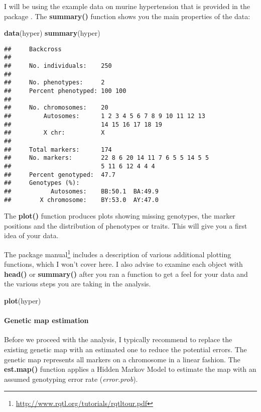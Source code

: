 \documentclass[12pt,]{krantz}
\newenvironment{Shaded}{\begin{snugshade}}{\end{snugshade}}
\newcommand{\KeywordTok}[1]{\textcolor[rgb]{0.27,0.27,0.27}{\textbf{{#1}}}}
\newcommand{\NormalTok}[1]{{#1}}
\let\oldparagraph\paragraph
\renewcommand{\paragraph}[1]{\oldparagraph{#1}\mbox{}}
\renewcommand{\href}[2]{#2\footnote{\url{#1}}}
\begin{document}
I will be using the example data on murine hypertension that is provided
in the package \citep{Sugiyama200170}. The \textbf{summary()} function
shows you the main properties of the data:

\begin{Shaded}
\begin{Highlighting}[]
\KeywordTok{data}\NormalTok{(hyper)}
\KeywordTok{summary}\NormalTok{(hyper)}
\end{Highlighting}
\end{Shaded}

\begin{verbatim}
##     Backcross
## 
##     No. individuals:    250 
## 
##     No. phenotypes:     2 
##     Percent phenotyped: 100 100 
## 
##     No. chromosomes:    20 
##         Autosomes:      1 2 3 4 5 6 7 8 9 10 11 12 13 
##                         14 15 16 17 18 19 
##         X chr:          X 
## 
##     Total markers:      174 
##     No. markers:        22 8 6 20 14 11 7 6 5 5 14 5 5 
##                         5 11 6 12 4 4 4 
##     Percent genotyped:  47.7 
##     Genotypes (%):    
##           Autosomes:    BB:50.1  BA:49.9 
##        X chromosome:    BY:53.0  AY:47.0
\end{verbatim}

The \textbf{plot()} function produces plots showing missing genotypes,
the marker positions and the distribution of phenotypes or traits. This
will give you a first idea of your data.

The \href{http://www.rqtl.org/tutorials/rqtltour.pdf}{package manual}
includes a description of various additional plotting functions, which I
won't cover here. I also advise to examine each object with
\textbf{head()} or \textbf{summary()} after you ran a function to get a
feel for your data and the various steps you are taking in the analysis.

\begin{Shaded}
\begin{Highlighting}[]
\KeywordTok{plot}\NormalTok{(hyper)}
\end{Highlighting}
\end{Shaded}

\paragraph{Genetic map estimation}\label{genetic-map-estimation}

Before we proceed with the analysis, I typically recommend to replace
the existing genetic map with an estimated one to reduce the potential
errors. The genetic map represents all markers on a chromosome in a
linear fashion. The \textbf{est.map()} function applies a Hidden Markov
Model \citep{Lander01041987} to estimate the map with an assumed
genotyping error rate (\emph{error.prob}).
\end{document}

